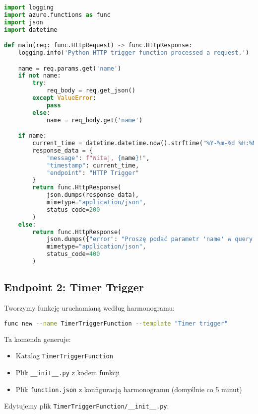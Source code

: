 \documentclass{article}
\begin{document}
\begin{lstlisting}[language=Python]
import logging
import azure.functions as func
import json
import datetime

def main(req: func.HttpRequest) -> func.HttpResponse:
    logging.info('Python HTTP trigger function processed a request.')

    name = req.params.get('name')
    if not name:
        try:
            req_body = req.get_json()
        except ValueError:
            pass
        else:
            name = req_body.get('name')

    if name:
        current_time = datetime.datetime.now().strftime("%Y-%m-%d %H:%M:%S")
        response_data = {
            "message": f"Witaj, {name}!",
            "timestamp": current_time,
            "endpoint": "HTTP Trigger"
        }
        return func.HttpResponse(
            json.dumps(response_data),
            mimetype="application/json",
            status_code=200
        )
    else:
        return func.HttpResponse(
            json.dumps({"error": "Proszę podać parametr 'name' w query string lub w body requestu"}),
            mimetype="application/json",
            status_code=400
        )
\end{lstlisting}

\subsection{Endpoint 2: Timer Trigger}

Tworzymy funkcję uruchamianą według harmonogramu:

\begin{lstlisting}[language=bash]
func new --name TimerTriggerFunction --template "Timer trigger"
\end{lstlisting}

Ta komenda generuje:
\begin{itemize}
    \item Katalog \texttt{TimerTriggerFunction}
    \item Plik \texttt{\_\_init\_\_.py} z kodem funkcji
    \item Plik \texttt{function.json} z konfiguracją harmonogramu (domyślnie co 5 minut)
\end{itemize}

Edytujemy plik \texttt{TimerTriggerFunction/\_\_init\_\_.py}:
\end{document}
